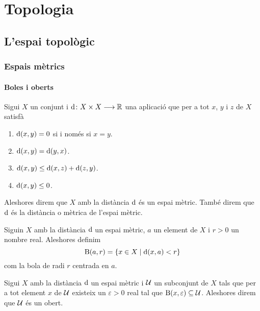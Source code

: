 \documentclass[../Apunts.tex]{subfiles}
\begin{document}
\part{Topologia}
\chapter{L'espai topològic}
	\section{Espais mètrics}
	\subsection{Boles i oberts}
	\begin{definition}
		\label{def:espai mètric}
		\label{def:distància}
		Sigui \(X\) un conjunt i \(\operatorname{d}\colon X\times X\longrightarrow\mathbb{R}\) una aplicació que per a tot \(x\), \(y\) i \(z\) de \(X\) satisfà
		\begin{enumerate}
			\item \(\operatorname{d}(x,y)=0\) si i només si \(x=y\).
			\item \(\operatorname{d}(x,y)=\operatorname{d}(y,x)\).
			\item \(\operatorname{d}(x,y)\leq\operatorname{d}(x,z)+\operatorname{d}(z,y)\).
			\item \(\operatorname{d}(x,y)\leq0\).
		\end{enumerate}
		Aleshores direm que \(X\) amb la distància \(\operatorname{d}\) és un espai mètric. També direm que \(\operatorname{d}\) és la distància o mètrica de l'espai mètric.
	\end{definition}
	\begin{definition}[Bola]
		\label{def:bola}
		Siguin \(X\) amb la distància \(\operatorname{d}\) un espai mètric, \(a\) un element de \(X\) i \(r>0\) un nombre real. Aleshores definim
		\[\operatorname{B}(a,r)=\{x\in X\mid\operatorname{d}(x,a)<r\}\]
		com la bola de radi \(r\) centrada en \(a\).
	\end{definition}
	\begin{definition}[Obert]
		\label{def:obert espai mètric}
		Sigui \(X\) amb la distància \(\operatorname{d}\) un espai mètric i \(\mathcal{U}\) un subconjunt de \(X\) tals que per a tot element \(x\) de \(\mathcal{U}\) existeix un \(\varepsilon>0\) real tal que \(\operatorname{B}(x,\varepsilon)\subseteq\mathcal{U}\). Aleshores direm que \(\mathcal{U}\) és un obert.
	\end{definition}
\end{document}
